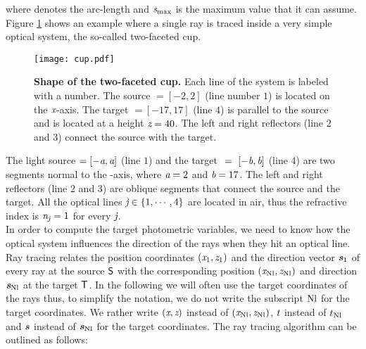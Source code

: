 where  denotes the arc-length and $\textit{s}_{\textrm{max}}$ is the maximum value that it can assume.
Figure \ref{fig:cup} shows an example where a single ray is traced inside a very simple optical system, the so-called two-faceted cup.
\begin{figure}[t]
\label{fig:cup}
  \begin{center}
  \texttt{[image: cup.pdf]}
  \end{center}
  \caption{\textbf{Shape of the two-faceted cup.}  Each line of the system is labeled with a number.
   The source $= [-2,2]$ (line number $1$) is located on the $\textit{x}$-axis.
   The target $= [-17, 17]$ (line $4$) is parallel to the source and is located at a height $\textit{z}= 40$.
   The left and right reflectors (line $2$ and $3$) connect the source with the target.}
  \label{fig:cup}
\end{figure}
The light source $= [-\textit{a}, \textit{a}]$ (line $1$) and the target $~=~ [-\textit{b}, \textit{b}]$ (line $4$) are two segments normal to the -axis, where $\textit{a}=2$ and $\textit{b}=17$.
The left and right reflectors (line $2$ and $3$) are oblique segments that connect the source and the target.
All the optical lines $\textit{j} \in \{1, \cdots, 4\}$  are located in air, thus the refractive index is $\textit{n}_{\textit{j}}=1$ for every $\textit{j}$. \\ \indent
In order to compute the target photometric variables, we need to know how the optical system influences the direction of the rays when they hit an optical line.
Ray tracing relates the position coordinates
 $ (\textit{x}_1, \textit{z}_1)$ and the direction vector $\textit{\textbf{s}}_1$ of every ray at the source $\textsf{S}$ with the corresponding position $(\textit{x}_{\textrm{Nl}}, \textit{z}_{\textrm{Nl}})$ and direction $\textit{\textbf{s}}_{\textrm{Nl}}$
 at the target $\textsf{T}$. In the following we will often use the target coordinates of the rays thus, to simplify the notation, we do not write the subscript $\textrm{Nl}$ for the target coordinates. We rather write $(\textit{x},\textit{z})$ instead of $(\textit{x}_{\textrm{Nl}}, \textit{z}_{\textrm{Nl}})$,  $t$ instead of $t_{\textrm{Nl}}$ and $\textit{\textbf{s}}$ instead of $\textit{\textbf{s}}_{\textrm{Nl}}$ for the target coordinates.
The ray tracing algorithm can be outlined as follows:
